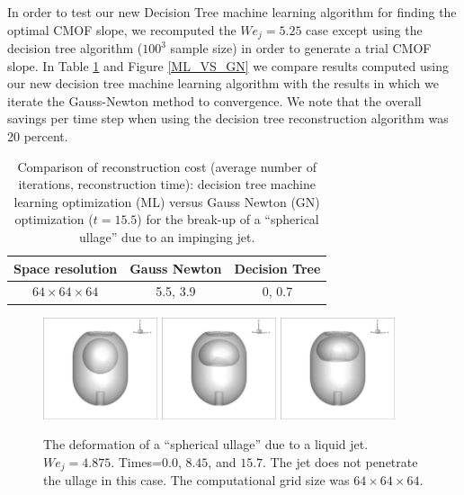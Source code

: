 \documentclass[]{article}
\begin{document}
In order to test our new Decision Tree machine learning algorithm for 
finding the optimal CMOF slope, we recomputed the $We_{j}=5.25$ case
except using the decision tree algorithm ($100^3$ sample size) in order
to generate a trial CMOF slope. In Table \ref{3DCOST} and
Figure \ref{ML_VS_GN} we compare results
computed using our new decision tree machine learning algorithm with 
the results in which we iterate the Gauss-Newton method to convergence.  
We note that the overall savings per time step when using the 
decision tree reconstruction algorithm was 20 percent.

\begin{table}[h!]
\caption{Comparison of reconstruction cost 
 (average number of iterations, reconstruction time): 
  decision tree
  machine learning optimization (ML) versus 
  Gauss Newton (GN)
  optimization ($t=15.5$) for the break-up of a ``spherical ullage'' due
  to an impinging jet.  }
 \centering
\begin{tabular}{|c|c|c|}
\hline
Space resolution &  Gauss Newton & Decision Tree   \\ \hline
$64\times 64\times 64$   & 5.5, 3.9 & 0, 0.7  \\ \hline
\end{tabular}
\label{3DCOST}
\end{table}


\begin{figure}[htbp]
\centering

\includegraphics[width=0.3\textwidth]{3D_WEJ4p875_0.eps} 
\includegraphics[width=0.3\textwidth]{3D_WEJ4p875_400.eps} 
\includegraphics[width=0.3\textwidth]{3D_WEJ4p875_800.eps} 

\caption{The deformation of a ``spherical ullage'' due to a liquid jet.  
	$We_{j}=4.875$.  
	Times=$0.0$, $8.45$, and $15.7$.
	The jet does not penetrate the ullage in this
	case.  The computational grid size was $64\times 64\times 64$. }
 \label{3DWEJ4p875}
\end{figure}
\end{document}
